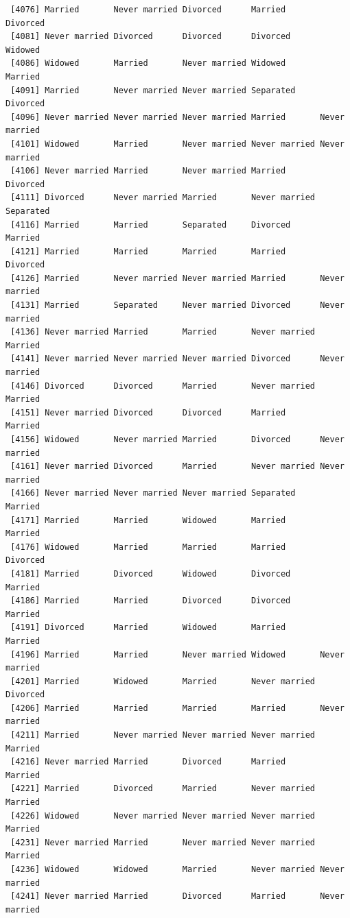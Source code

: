 \documentclass[
  letterpaper,
  DIV=11,
  numbers=noendperiod,
  oneside]{scrartcl}
\begin{document}
\begin{verbatim}
 [4076] Married       Never married Divorced      Married       Divorced     
 [4081] Never married Divorced      Divorced      Divorced      Widowed      
 [4086] Widowed       Married       Never married Widowed       Married      
 [4091] Married       Never married Never married Separated     Divorced     
 [4096] Never married Never married Never married Married       Never married
 [4101] Widowed       Married       Never married Never married Never married
 [4106] Never married Married       Never married Married       Divorced     
 [4111] Divorced      Never married Married       Never married Separated    
 [4116] Married       Married       Separated     Divorced      Married      
 [4121] Married       Married       Married       Married       Divorced     
 [4126] Married       Never married Never married Married       Never married
 [4131] Married       Separated     Never married Divorced      Never married
 [4136] Never married Married       Married       Never married Married      
 [4141] Never married Never married Never married Divorced      Never married
 [4146] Divorced      Divorced      Married       Never married Married      
 [4151] Never married Divorced      Divorced      Married       Married      
 [4156] Widowed       Never married Married       Divorced      Never married
 [4161] Never married Divorced      Married       Never married Never married
 [4166] Never married Never married Never married Separated     Married      
 [4171] Married       Married       Widowed       Married       Married      
 [4176] Widowed       Married       Married       Married       Divorced     
 [4181] Married       Divorced      Widowed       Divorced      Married      
 [4186] Married       Married       Divorced      Divorced      Married      
 [4191] Divorced      Married       Widowed       Married       Married      
 [4196] Married       Married       Never married Widowed       Never married
 [4201] Married       Widowed       Married       Never married Divorced     
 [4206] Married       Married       Married       Married       Never married
 [4211] Married       Never married Never married Never married Married      
 [4216] Never married Married       Divorced      Married       Married      
 [4221] Married       Divorced      Married       Never married Married      
 [4226] Widowed       Never married Never married Never married Married      
 [4231] Never married Married       Never married Never married Married      
 [4236] Widowed       Widowed       Married       Never married Never married
 [4241] Never married Married       Divorced      Married       Never married

\end{verbatim}
\end{document}
